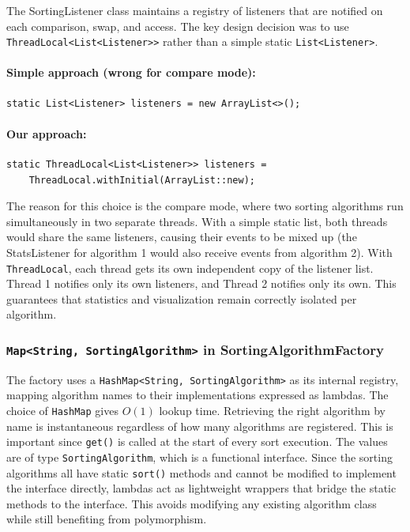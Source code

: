 \documentclass{article}
\begin{document}
The SortingListener class maintains a registry of listeners that are notified on each comparison, swap, and access. The key design decision was to use \texttt{ThreadLocal<List<Listener>>} rather than a simple static \texttt{List<Listener>}.

\paragraph{Simple approach (wrong for compare mode):}
\begin{verbatim}
static List<Listener> listeners = new ArrayList<>();
\end{verbatim}

\paragraph{Our approach:}
\begin{verbatim}
static ThreadLocal<List<Listener>> listeners = 
    ThreadLocal.withInitial(ArrayList::new);
\end{verbatim}

The reason for this choice is the compare mode, where two sorting algorithms run simultaneously in two separate threads. With a simple static list, both threads would share the same listeners, causing their events to be mixed up (the StatsListener for algorithm 1 would also receive events from algorithm 2).
With \texttt{ThreadLocal}, each thread gets its own independent copy of the listener list. Thread 1 notifies only its own listeners, and Thread 2 notifies only its own. This guarantees that statistics and visualization remain correctly isolated per algorithm.

\subsubsection{\texttt{Map<String, SortingAlgorithm>} in SortingAlgorithmFactory}

The factory uses a \texttt{HashMap<String, SortingAlgorithm>} as its internal registry, mapping algorithm names to their implementations expressed as lambdas. The choice of \texttt{HashMap} gives $O(1)$ lookup time. Retrieving the right algorithm by name is instantaneous regardless of how many algorithms are registered. This is important since \texttt{get()} is called at the start of every sort execution. The values are of type \texttt{SortingAlgorithm}, which is a functional interface. Since the sorting algorithms all have static \texttt{sort()} methods and cannot be modified to implement the interface directly, lambdas act as lightweight wrappers that bridge the static methods to the interface. This avoids modifying any existing algorithm class while still benefiting from polymorphism.
\end{document}
